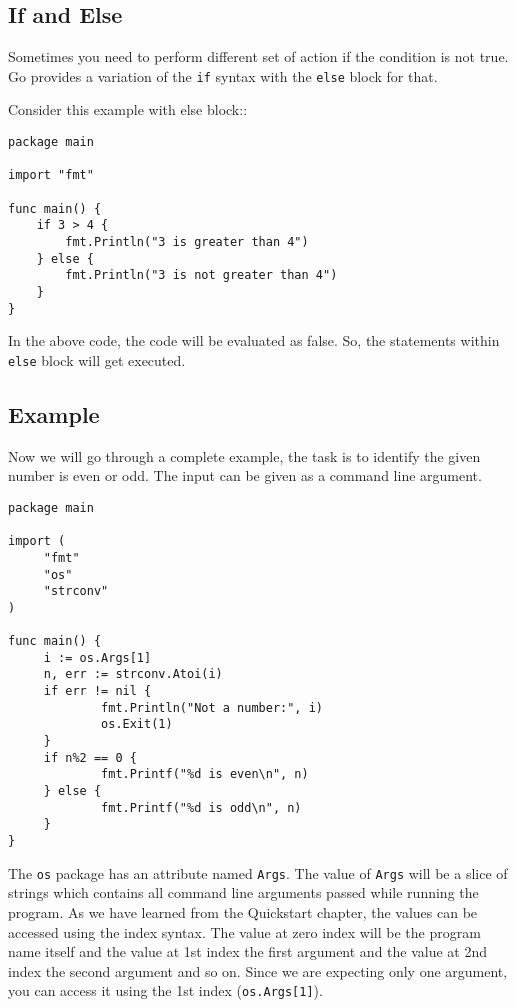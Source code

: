 \subsection{If and Else}

Sometimes you need to perform different set of action if the condition
is not true.  Go provides a variation of the \texttt{if} syntax with
the \texttt{else} block for that.

Consider this example with else block::

\begin{lstlisting}[caption=If with else block]
package main

import "fmt"

func main() {
    if 3 > 4 {
        fmt.Println("3 is greater than 4")
    } else {
        fmt.Println("3 is not greater than 4")
    }
}
\end{lstlisting}

In the above code, the code will be evaluated as false.  So, the
statements within \texttt{else} block will get executed.

\subsection{Example}

Now we will go through a complete example, the task is to identify the
given number is even or odd.  The input can be given as a command line
argument.

\begin{lstlisting}[caption=If with else example]
package main

import (
     "fmt"
     "os"
     "strconv"
)

func main() {
     i := os.Args[1]
     n, err := strconv.Atoi(i)
     if err != nil {
             fmt.Println("Not a number:", i)
             os.Exit(1)
     }
     if n%2 == 0 {
             fmt.Printf("%d is even\n", n)
     } else {
             fmt.Printf("%d is odd\n", n)
     }
}
\end{lstlisting}

The \texttt{os} package has an attribute named \texttt{Args}.  The
value of \texttt{Args} will be a slice of strings which contains all
command line arguments passed while running the program.  As we have
learned from the Quickstart chapter, the values can be accessed using
the index syntax.  The value at zero index will be the program name
itself and the value at 1st index the first argument and the value at
2nd index the second argument and so on.  Since we are expecting only
one argument, you can access it using the 1st index
(\texttt{os.Args[1]}).

